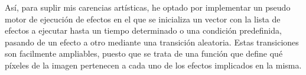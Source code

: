 \documentclass[12pt]{article}%
\begin{document}
	Así, para suplir mis carencias artísticas, he optado por implementar un pseudo motor de ejecución de efectos en el que se inicializa un vector con la lista de efectos a ejecutar hasta un tiempo determinado o una condición predefinida, pasando de un efecto a otro mediante una transición aleatoria. Estas transiciones son facilmente ampliables, puesto que se trata de una función que define qué píxeles de la imagen pertenecen a cada uno de los efectos implicados en la misma.
	
	
\end{document}
